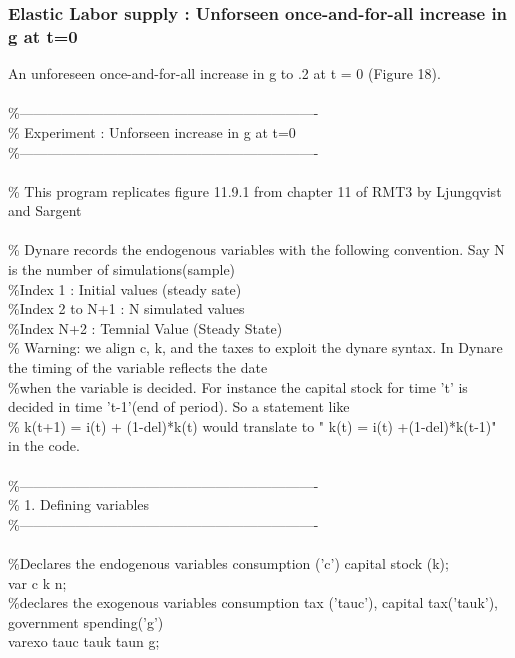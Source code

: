 \documentclass[a4paper,12pt]{scrartcl} %
\begin{document}
\subsubsection{Elastic Labor supply : Unforseen once-and-for-all increase in g at t=0}

An unforeseen once-and-for-all increase in g to .2 at t = 0 (Figure 18).\\
\\

\%----------------------------------------------------------------\\
\% Experiment  : Unforseen increase in g at t=0\\
\%----------------------------------------------------------------\\
\\
\% This program replicates figure 11.9.1 from chapter 11 of RMT3 by Ljungqvist and Sargent\\
\\
\% Dynare records the endogenous variables with the following convention. Say N is the number of simulations(sample)\\
\%Index 1 : Initial values (steady sate)\\
\%Index 2 to N+1 : N simulated values\\
\%Index N+2 : Temnial Value (Steady State)\\
\% Warning:  we align c, k, and the taxes to exploit the dynare syntax. In Dynare the timing of the variable reflects the date\\
\%when the variable is decided. For instance the capital stock for time 't' is decided in time 't-1'(end of period). So a statement like\\
\% k(t+1) = i(t) + (1-del)*k(t) would translate to " k(t) = i(t) +(1-del)*k(t-1)" in the code.\\
\\
\%----------------------------------------------------------------\\
\% 1. Defining variables\\
\%----------------------------------------------------------------\\
\\
\%Declares the endogenous variables consumption ('c') capital stock (k);\\
var c k n;\\
\%declares the exogenous variables   consumption tax ('tauc'), capital tax('tauk'), government spending('g')\\
varexo tauc tauk taun g;\\
\end{document}
